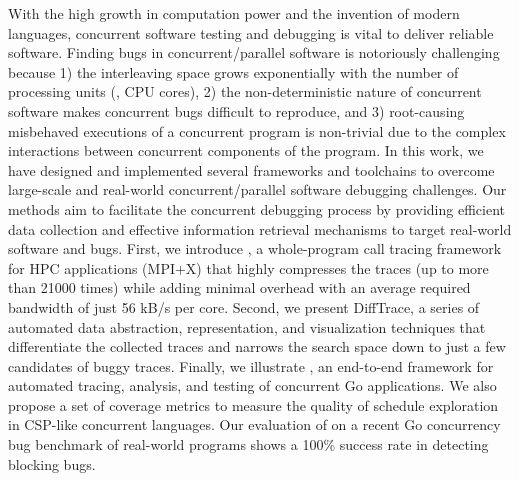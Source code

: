 
With the high growth in computation power and the invention of modern languages, concurrent software testing and debugging is vital to deliver reliable software.
%
Finding bugs in concurrent/parallel software is notoriously challenging because 1) the interleaving space grows exponentially with the number of processing units (\eg, CPU cores), 2) the non-deterministic nature of concurrent software makes concurrent bugs difficult to reproduce, and 3) root-causing misbehaved executions of a concurrent program is non-trivial due to the complex interactions between concurrent components of the program.
%
In this work, we have designed and implemented several frameworks and toolchains to overcome large-scale and real-world concurrent/parallel software debugging challenges.
%
Our methods aim to facilitate the concurrent debugging process by providing efficient data collection and effective information retrieval mechanisms to target real-world software and bugs.
%
First, we introduce \parlot, a whole-program call tracing framework for HPC applications (MPI+X) that highly compresses the traces (up to more than 21000 times) while adding minimal overhead with an average required bandwidth of just 56 kB/s per core.
%
Second, we present DiffTrace, a series of automated data abstraction, representation, and visualization techniques that differentiate the collected \parlot traces and narrows the search space down to just a few candidates of buggy traces.
%
Finally, we illustrate \goat, an end-to-end framework for automated tracing, analysis, and testing of concurrent Go applications.
%
We also propose a set of coverage metrics to measure the quality of schedule exploration in CSP-like concurrent languages.
%
Our evaluation of \goat on a recent Go concurrency bug benchmark of real-world programs shows a 100\% success rate in detecting blocking bugs.
